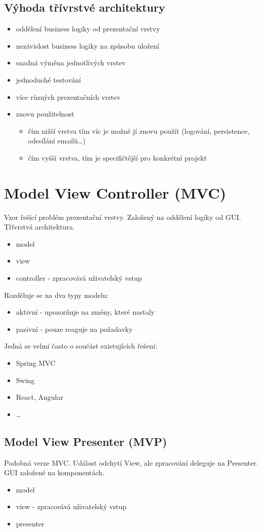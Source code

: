 \documentclass{szzclass}
\begin{document}
\subsection{Výhoda třívrstvé architektury}
\begin{itemize}
    \item oddělení business logiky od prezentační vrstvy
    \item nezávislost business logiky na způsobu uložení
    \item snadná výměna jednotlivých vrstev
    \item jednoduché testování
    \item více různých prezentačních vrstev
    \item znovu použitelnost
    \begin{itemize}
        \item čím nižší vrstva tím víc je možné jí znovu použít (logování, persistence, odesílání emailů\dots)
        \item čím vyšší vrstva, tím je specifičtější pro konkrétní projekt
    \end{itemize}
\end{itemize}
\section{Model View Controller (MVC)}
Vzor řešící problém prezentační vrstvy. Založený na oddělení logiky od GUI. Třívrstvá architektura.
\begin{itemize}
    \item model
    \item view
    \item controller - zpracovává uživatelský vstup
\end{itemize}
Rozděluje se na dva typy modelu:
\begin{itemize}
    \item aktivní - upozorňuje na změny, které nastaly
    \item pasivní - pouze reaguje na požadavky
\end{itemize}
Jedná se velmi často o součást existujících řešení:
\begin{itemize}
    \item Spring MVC
    \item Swing
    \item React, Angular
    \item \dots
\end{itemize} 
\subsection{Model View Presenter (MVP)}
Podobná verze MVC. Událost odchytí View, ale zpracování deleguje na Presenter. GUI založené na komponentách.
\begin{itemize}
    \item model
    \item view - zpracovává uživatelský vstup
    \item presenter
\end{itemize}
\end{document}
